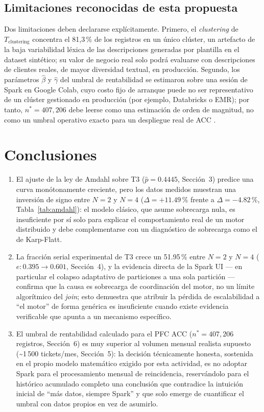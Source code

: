 \documentclass[11pt]{article}
\begin{document}
\subsection{Limitaciones reconocidas de esta propuesta}

Dos limitaciones deben declararse explícitamente. Primero, el
\emph{clustering} de $T_{\mathrm{clustering}}$ concentra el 81{,}3\,\%
de los registros en un único clúster, un artefacto de la baja
variabilidad léxica de las descripciones generadas por plantilla en el
dataset sintético; su valor de negocio real solo podrá evaluarse con
descripciones de clientes reales, de mayor diversidad textual, en
producción. Segundo, los parámetros $\hat\beta$ y $\hat\gamma$ del
umbral de rentabilidad se estimaron sobre una sesión de Spark en Google
Colab, cuyo costo fijo de arranque puede no ser representativo de un
clúster gestionado en producción (por ejemplo, Databricks o EMR); por
tanto, $n^*=407{,}206$ debe leerse como una estimación de orden de
magnitud, no como un umbral operativo exacto para un despliegue real de
ACC \cite{hillmarty2008}.

\section{Conclusiones}

\begin{enumerate}
  \item El ajuste de la ley de Amdahl sobre T3 ($\hat p=0.4445$,
  Sección~3) predice una curva monótonamente creciente, pero los datos
  medidos muestran una inversión de signo entre $N=2$ y $N=4$
  ($\Delta=+11.49\,\%$ frente a $\Delta=-4.82\,\%$,
  Tabla~\ref{tab:amdahl}): el modelo clásico, que asume sobrecarga nula,
  es insuficiente por sí solo para explicar el comportamiento real de un
  motor distribuido y debe complementarse con un diagnóstico de
  sobrecarga como el de Karp-Flatt.

  \item La fracción serial experimental de T3 crece un 51.95\,\% entre
  $N=2$ y $N=4$ ($e:0.395\rightarrow0.601$, Sección~4), y la evidencia
  directa de la Spark UI --- en particular el colapso adaptativo de
  particiones a una sola partición --- confirma que la causa es
  sobrecarga de coordinación del motor, no un límite algorítmico del
  \emph{join}; esto demuestra que atribuir la pérdida de escalabilidad a
  ``el motor'' de forma genérica es insuficiente cuando existe evidencia
  verificable que apunta a un mecanismo específico.

  \item El umbral de rentabilidad calculado para el PFC ACC
  ($n^*=407{,}206$ registros, Sección~6) es muy superior al volumen
  mensual realista supuesto (\textasciitilde1\,500 tickets/mes,
  Sección~5): la decisión técnicamente honesta, sostenida en el propio
  modelo matemático exigido por esta actividad, es no adoptar Spark
  para el procesamiento mensual de reincidencia, reservándolo para el
  histórico acumulado completo una conclusión que contradice la
  intuición inicial de ``más datos, siempre Spark'' y que solo emerge de
  cuantificar el umbral con datos propios en vez de asumirlo.
\end{enumerate}
\end{document}

